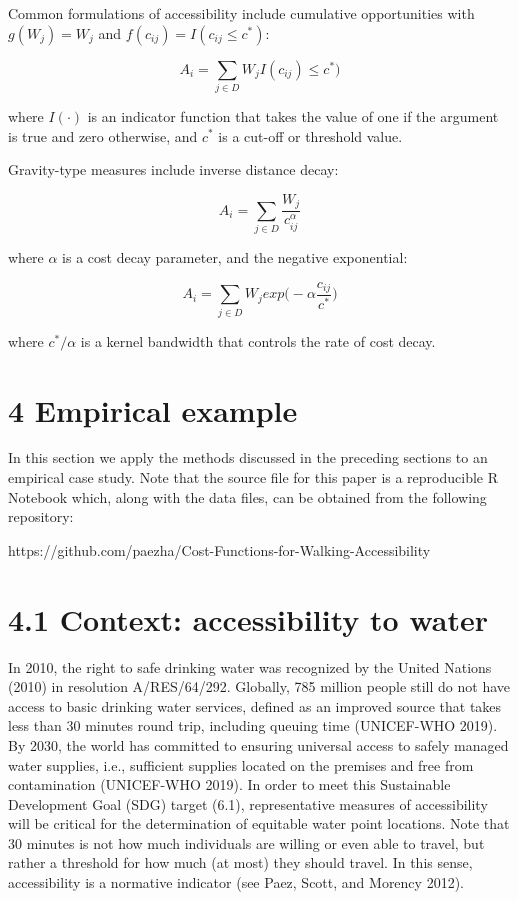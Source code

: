 \documentclass[]{elsarticle} %
\begin{document}
Common formulations of accessibility include cumulative opportunities
with \(g(W_j)=W_j\) and \(f(c_{ij})=I(c_{ij}\le c^*)\):

\begin{equation} \label{eq:9}A_i = \sum_{j\in D}W_jI(c_{ij})\le c^*)\end{equation}

\noindent where \(I(\cdot)\) is an indicator function that takes the
value of one if the argument is true and zero otherwise, and \(c^*\) is
a cut-off or threshold value.

Gravity-type measures include inverse distance decay:

\begin{equation} \label{eq:10}A_i = \sum_{j\in D}\frac{W_j}{c_{ij}^\alpha}\end{equation}

\noindent where \(\alpha\) is a cost decay parameter, and the negative
exponential:

\begin{equation} \label{eq:11}A_i = \sum_{j\in D}W_jexp\Big(-\alpha \frac{c_{ij}}{c^*}\Big)\end{equation}

\noindent where \(c^*/\alpha\) is a kernel bandwidth that controls the
rate of cost decay.

\hypertarget{empirical-example}{%
\section{4 Empirical example}\label{empirical-example}}

In this section we apply the methods discussed in the preceding sections
to an empirical case study. Note that the source file for this paper is
a reproducible R Notebook which, along with the data files, can be
obtained from the following repository:

https://github.com/paezha/Cost-Functions-for-Walking-Accessibility

\hypertarget{context-accessibility-to-water}{%
\section{4.1 Context: accessibility to
water}\label{context-accessibility-to-water}}

In 2010, the right to safe drinking water was recognized by the United
Nations (2010) in resolution A/RES/64/292. Globally, 785 million people
still do not have access to basic drinking water services, defined as an
improved source that takes less than 30 minutes round trip, including
queuing time (UNICEF-WHO 2019). By 2030, the world has committed to
ensuring universal access to safely managed water supplies, i.e.,
sufficient supplies located on the premises and free from contamination
(UNICEF-WHO 2019). In order to meet this Sustainable Development Goal
(SDG) target (6.1), representative measures of accessibility will be
critical for the determination of equitable water point locations. Note
that 30 minutes is not how much individuals are willing or even able to
travel, but rather a threshold for how much (at most) they should
travel. In this sense, accessibility is a normative indicator (see Paez,
Scott, and Morency 2012).
\end{document}
